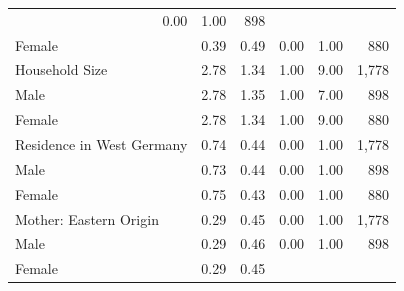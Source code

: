 \documentclass[a4paper, oneside, hyperfootnotes = false]{article}
\begin{document}
{\begin{table}[ht]
\begin{center}
{\begin{tabular}{llllll}
			\multicolumn{1}{r}{0.00} &
			\multicolumn{1}{r}{1.00} &
			\multicolumn{1}{r}{898} \\
			\multicolumn{1}{l}{\hspace{1em}Female} &
			\multicolumn{1}{r}{0.39} &
			\multicolumn{1}{r}{0.49} &
			\multicolumn{1}{r}{0.00} &
			\multicolumn{1}{r}{1.00} &
			\multicolumn{1}{r}{880} \\
			\multicolumn{1}{l}{Household Size} &
			\multicolumn{1}{r}{2.78} &
			\multicolumn{1}{r}{1.34} &
			\multicolumn{1}{r}{1.00} &
			\multicolumn{1}{r}{9.00} &
			\multicolumn{1}{r}{1,778} \\
			\multicolumn{1}{l}{\hspace{1em}Male} &
			\multicolumn{1}{r}{2.78} &
			\multicolumn{1}{r}{1.35} &
			\multicolumn{1}{r}{1.00} &
			\multicolumn{1}{r}{7.00} &
			\multicolumn{1}{r}{898} \\
			\multicolumn{1}{l}{\hspace{1em}Female} &
			\multicolumn{1}{r}{2.78} &
			\multicolumn{1}{r}{1.34} &
			\multicolumn{1}{r}{1.00} &
			\multicolumn{1}{r}{9.00} &
			\multicolumn{1}{r}{880} \\
			\multicolumn{1}{l}{Residence in West Germany} &
			\multicolumn{1}{r}{0.74} &
			\multicolumn{1}{r}{0.44} &
			\multicolumn{1}{r}{0.00} &
			\multicolumn{1}{r}{1.00} &
			\multicolumn{1}{r}{1,778} \\
			\multicolumn{1}{l}{\hspace{1em}Male} &
			\multicolumn{1}{r}{0.73} &
			\multicolumn{1}{r}{0.44} &
			\multicolumn{1}{r}{0.00} &
			\multicolumn{1}{r}{1.00} &
			\multicolumn{1}{r}{898} \\
			\multicolumn{1}{l}{\hspace{1em}Female} &
			\multicolumn{1}{r}{0.75} &
			\multicolumn{1}{r}{0.43} &
			\multicolumn{1}{r}{0.00} &
			\multicolumn{1}{r}{1.00} &
			\multicolumn{1}{r}{880} \\
			\multicolumn{1}{l}{Mother: Eastern Origin} &
			\multicolumn{1}{r}{0.29} &
			\multicolumn{1}{r}{0.45} &
			\multicolumn{1}{r}{0.00} &
			\multicolumn{1}{r}{1.00} &
			\multicolumn{1}{r}{1,778} \\
			\multicolumn{1}{l}{\hspace{1em}Male} &
			\multicolumn{1}{r}{0.29} &
			\multicolumn{1}{r}{0.46} &
			\multicolumn{1}{r}{0.00} &
			\multicolumn{1}{r}{1.00} &
			\multicolumn{1}{r}{898} \\
			\multicolumn{1}{l}{\hspace{1em}Female} &
			\multicolumn{1}{r}{0.29} &
			\multicolumn{1}{r}{0.45} &

\end{tabular}}
\end{center}
\end{table}}
\end{document}
